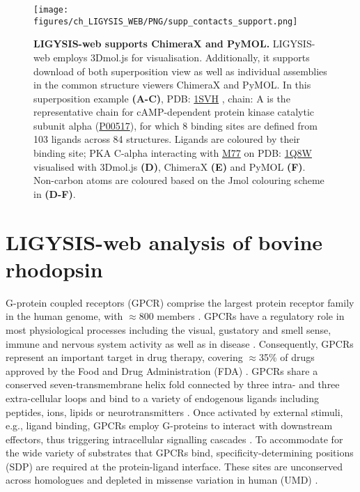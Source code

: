 \begin{figure}[htb!]
    \centering
    \texttt{[image: figures/ch\_LIGYSIS\_WEB/PNG/supp\_contacts\_support.png]}
    \caption[LIGYSIS-web supports ChimeraX and PyMOL]{\textbf{LIGYSIS-web supports ChimeraX and PyMOL.} LIGYSIS-web employs 3Dmol.js for visualisation. Additionally, it supports download of both superposition view as well as individual assemblies in the common structure viewers ChimeraX and PyMOL. In this superposition example \textbf{(A-C)}, PDB: \href{https://www.ebi.ac.uk/pdbe/entry/pdb/1svh}{1SVH} \cite{BREITENLECHNER_2004_PKB}, chain: A is the representative chain for cAMP-dependent protein kinase catalytic subunit alpha (\href{https://www.uniprot.org/uniprotkb/P00517/entry}{P00517}), for which 8 binding sites are defined from 103 ligands across 84 structures. Ligands are coloured by their binding site; PKA C-alpha interacting with \href{https://www.ebi.ac.uk/pdbe-srv/pdbechem/chemicalCompound/show/M77}{M77} on PDB: \href{https://www.ebi.ac.uk/pdbe/entry/pdb/1q8w}{1Q8W} \cite{BREITENLECHNER_2003_PKA} visualised with 3Dmol.js \textbf{(D)}, ChimeraX \textbf{(E)} and PyMOL \textbf{(F)}. Non-carbon atoms are coloured based on the Jmol colouring scheme \cite{JMOL} in \textbf{(D-F)}.}
    \label{fig:supp_suport}
\end{figure}

\section{LIGYSIS-web analysis of bovine rhodopsin}

G-protein coupled receptors (GPCR) comprise the largest protein receptor family in the human genome, with $\approx$800 members \cite{LIU_2024_GPCRs}. GPCRs have a regulatory role in most physiological processes including the visual, gustatory and smell sense, immune and nervous system activity as well as in disease \cite{LATORRACA_2017_GPCRs}. Consequently, GPCRs represent  an important target in drug therapy, covering $\approx$35\% of drugs approved by the Food and Drug Administration (FDA) \cite{HAUSER_2017_GPCRS, INSEL_2019_GPCRs}. GPCRs share a conserved seven-transmembrane helix fold connected by three intra- and three extra-cellular loops \cite{ZHANG_2024_GPCRs} and bind to a variety of endogenous ligands including peptides, ions, lipids or neurotransmitters \cite{ZARZYCKA_2019_GPCRs, MANNES_2022_GPCRs}. Once activated by external stimuli, e.g., ligand binding, GPCRs employ G-proteins to interact with downstream effectors, thus triggering intracellular signalling cascades \cite{CHENG_2023_GPCRs}. To accommodate for the wide variety of substrates that GPCRs bind, specificity-determining positions (SDP) are required at the protein-ligand interface. These sites are unconserved across homologues and depleted in missense variation in human (UMD) \cite{MACGOWAN_2024_VARIANTS}.


